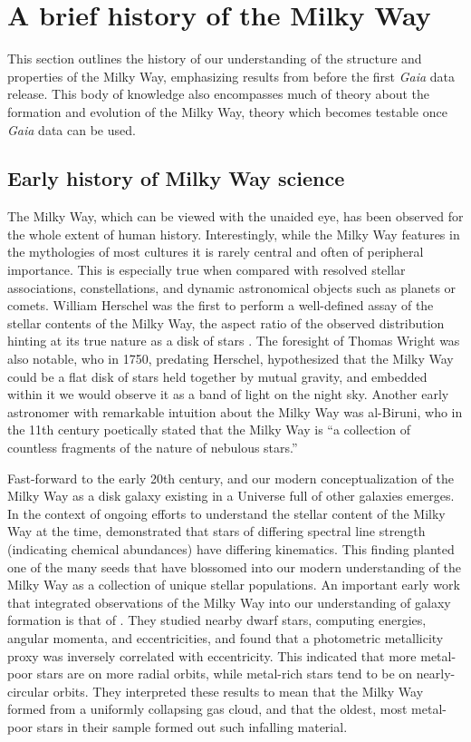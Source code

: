 
\section{A brief history of the Milky Way}

This section outlines the history of our understanding of the structure and properties of the Milky Way, emphasizing results from before the first \textit{Gaia} data release. This body of knowledge also encompasses much of theory about the formation and evolution of the Milky Way, theory which becomes testable once \textit{Gaia} data can be used. 

\subsection{Early history of Milky Way science}

The Milky Way, which can be viewed with the unaided eye, has been observed for the whole extent of human history. Interestingly, while the Milky Way features in the mythologies of most cultures it is rarely central and often of peripheral importance. This is especially true when compared with resolved stellar associations, constellations, and dynamic astronomical objects such as planets or comets. William Herschel was the first to perform a well-defined assay of the stellar contents of the Milky Way, the aspect ratio of the observed distribution hinting at its true nature as a disk of stars \parencite{herschel1785}. The foresight of Thomas Wright was also notable, who in 1750, predating Herschel, hypothesized that the Milky Way could be a flat disk of stars held together by mutual gravity, and embedded within it we would observe it as a band of light on the night sky. Another early astronomer with remarkable intuition about the Milky Way was al-Biruni, who in the 11th century poetically stated that the Milky Way is ``a collection of countless fragments of the nature of nebulous stars.''

Fast-forward to the early 20th century, and our modern conceptualization of the Milky Way as a disk galaxy existing in a Universe full of other galaxies emerges. In the context of ongoing efforts to understand the stellar content of the Milky Way at the time, \textcite{roman50} demonstrated that stars of differing spectral line strength (indicating chemical abundances) have differing kinematics. This finding planted one of the many seeds that have blossomed into our modern understanding of the Milky Way as a collection of unique stellar populations. An important early work that integrated observations of the Milky Way into our understanding of galaxy formation is that of \textcite{eggen62}. They studied nearby dwarf stars, computing energies, angular momenta, and eccentricities, and found that a photometric metallicity proxy was inversely correlated with eccentricity. This indicated that more metal-poor stars are on more radial orbits, while metal-rich stars tend to be on nearly-circular orbits. They interpreted these results to mean that the Milky Way formed from a uniformly collapsing gas cloud, and that the oldest, most metal-poor stars in their sample formed out such infalling material.

